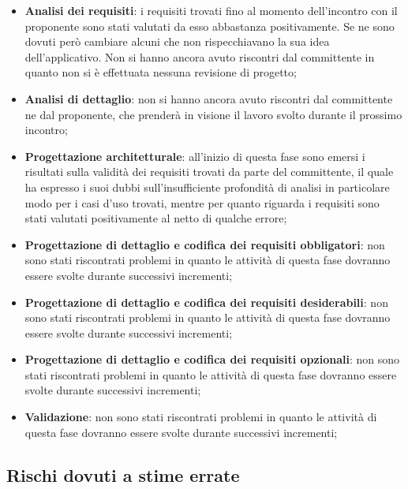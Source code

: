 		\begin{itemize}
			\item \textbf{Analisi dei requisiti}: i requisiti trovati fino al momento dell'incontro con il proponente sono stati valutati da esso abbastanza positivamente. Se ne sono dovuti però cambiare alcuni che non rispecchiavano la sua idea dell'applicativo.  \newline
			Non si hanno ancora avuto riscontri dal committente in quanto non si è effettuata nessuna revisione di progetto;
			\item \textbf{Analisi di dettaglio}: non si hanno ancora avuto riscontri dal committente ne dal proponente, che prenderà in visione il lavoro svolto durante il prossimo incontro;
			\item \textbf{Progettazione architetturale}: all'inizio di questa fase sono emersi i risultati sulla validità dei requisiti trovati da parte del committente, il quale ha espresso i suoi dubbi sull'insufficiente profondità di analisi in particolare modo per i casi d'uso trovati, mentre per quanto riguarda i requisiti sono stati valutati positivamente al netto di qualche errore;
			\item \textbf{Progettazione di dettaglio e codifica dei requisiti obbligatori}: non sono stati riscontrati problemi in quanto le attività di questa fase dovranno essere svolte durante successivi incrementi;
			\item \textbf{Progettazione di dettaglio e codifica dei requisiti desiderabili}: non sono stati riscontrati problemi in quanto le attività di questa fase dovranno essere svolte durante successivi incrementi;
			\item \textbf{Progettazione di dettaglio e codifica dei requisiti opzionali}: non sono stati riscontrati problemi in quanto le attività di questa fase dovranno essere svolte durante successivi incrementi;
			\item \textbf{Validazione}: non sono stati riscontrati problemi in quanto le attività di questa fase dovranno essere svolte durante successivi incrementi;
		\end{itemize}


	\subsection{Rischi dovuti a stime errate} %
	\label{sub:rischi_dovuti_a_stime_errate}
